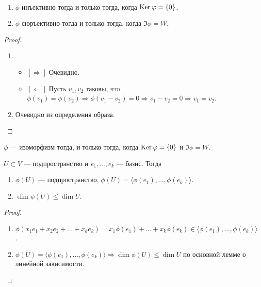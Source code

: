 \begin{Suggestion}
    \ 
    \begin{enumerate}
        \item $\phi$ инъективно тогда и только тогда, когда $\mathrm{Ker}\: \varphi = \{0\}$.
        \item $\phi$ сюръективно тогда и только тогда, когда $\Im \phi = W$.
    \end{enumerate} 
\end{Suggestion}

\begin{proof}
    \
    \begin{enumerate}
        \item \begin{itemize}
            \item $[\Rightarrow]$ Очевидно.
            \item $[\Leftarrow]$ Пусть $v_1, v_2$ таковы, что $\phi(v_1)=\phi(v_2) \Rightarrow \phi (v_1 - v_2) = 0 \Rightarrow v_1 - v_2 = 0 \Rightarrow v_1 = v_2 $.
        \end{itemize}
        \item Очевидно из определения образа.
    \end{enumerate}
\end{proof}

\begin{Consequence}
    $\phi$ --- изоморфизм тогда, и только тогда, когда $\mathrm{Ker}\: \varphi =\{0\}$ и $\Im \phi = W$.
\end{Consequence}

\begin{Suggestion}
    $U \subset V$ --- подпространство и $e_1, \ldots, e_k$ --- базис. Тогда
    \begin{enumerate}
        \item $\phi(U)$ --- подпространство, $\phi(U) = \langle \phi(e_1), \ldots, \phi(e_k)\rangle$.
        \item $\dim \phi(U) \leqslant \dim U$.
    \end{enumerate}
\end{Suggestion}

\begin{proof}
    \ 
    \begin{enumerate}
        \item $\phi(x_1e_1 + x_2e_2 + \ldots + x_ke_k) = x_1\phi(e_1) + \ldots + x_k\phi(e_k) \in \langle \phi(e_1), \ldots, \phi(e_k)\rangle$.
        \item $\phi(U) = \langle\phi(e_1), \ldots, \phi(e_k)\rangle \Rightarrow \dim \phi(U) \leqslant \dim U$ по основной лемме о линейной зависимости.
    \end{enumerate}
\end{proof}

